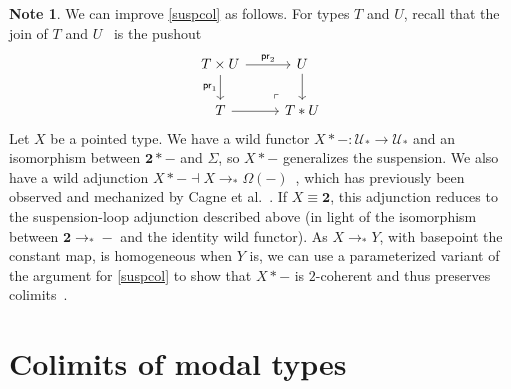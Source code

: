 \documentclass[10pt,a4paper]{article}
\theoremstyle{definition}
\newtheorem{note}[thm]{Note}
\theoremstyle{remark}
\newcommand{\U}{\mathcal{U}}
\newcommand{\0}{\mathbf{0}}
\newcommand{\1}{\mathbf{1}}
\newcommand{\2}{\mathbf{2}}
\DeclareMathOperator{\pr}{\mathsf{pr}}
\newcommand{\myhref}[2]{%
  \href{#1}{\textcolor{blue!30!black}{#2}}%
}
\begin{document}
\begin{note} \label{joinpres}
We can improve \autoref{suspcol} as follows. For types $T$ and $U$, recall that the join of $T$ and $U$~\cite[Section 6.8]{Uni13} is the pushout
\[\begin{tikzcd}
	{T \times U} & U \\
	T & {T \ast U}
	\arrow["{\pr_2}", from=1-1, to=1-2]
	\arrow["{\pr_1}"', from=1-1, to=2-1]
	\arrow[from=1-2, to=2-2]
	\arrow[from=2-1, to=2-2]
	\arrow["\lrcorner"{anchor=center, pos=0.125, rotate=180}, draw=none, from=2-2, to=1-1]
\end{tikzcd}\]
Let $X$ be a pointed type. We have a wild functor $X \ast {-} : \U_{\ast} \to \U_{\ast}$ and an isomorphism between $\2 \ast {-}$ and $\Sigma$, so $X \ast {-}$ generalizes the suspension. We also have a wild adjunction $X \ast {-} \dashv X \to_{\ast} \Omega({-})$~\cite[\myhref{https://github.com/PHart3/colimits-agda/blob/lapc-lmcs/HoTT-Agda/theorems/homotopy/Join/JoinAdjointLoopCod.agda\#L286}{JoinLoopCodAdj}]{2cohagda-pub}, which has previously been observed and mechanized by Cagne et al.~\cite[Proposition B.10]{symsph}. If $X \equiv \2$, this adjunction reduces to the suspension-loop adjunction described above (in light of the isomorphism between $\2 \to _{\ast} {-}$ and the identity wild functor). As $X \to_{\ast} Y$, with basepoint the constant map, is homogeneous when $Y$ is, we can use a parameterized variant of the argument for \autoref{suspcol} to show that $X \ast {-}$ is $2$-coherent and thus preserves colimits~\cite[\myhref{https://github.com/PHart3/colimits-agda/blob/lapc-lmcs/HoTT-Agda/theorems/homotopy/Join/Join-colim.agda}{Join-colim}]{2cohagda-pub}.
\end{note}

\section{Colimits of modal types} \label{ModCol}
\end{document}
